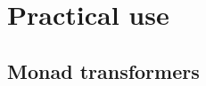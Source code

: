 \section{Practical use}

\subsection{Monad transformers}
\subsubsection{}
\frame{%
   \frametitle{\subsecname}
   \frametitle{\subsubsecname}
}
\frame{%
}
\frame{%
}
\frame{%
}
